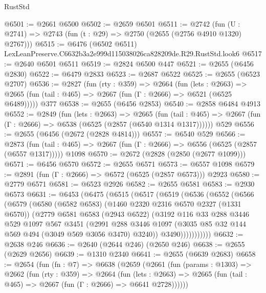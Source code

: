 \begin{lexlean}{RustStd}
\begin{coremodule}
@6501 := @2661 @6500
@6502 := @2659 @6501
@6511 := @2742 (fun (U : @2741) => @2743 (fun (t : @29) => @2750 (@2655 (@2756 @4910 @1320) @2767)))
@6515 := @6476 (@6502 @6511) LexLeanPreserve.C6632b3a2e999d115038026ca828209de.R29.RustStd.look6
@6517 := @2640 @6501 @6511
@6519 := @2824 @6500 @447
@6521 := @2655 (@6456 @2830)
@6522 := @6479 @2833
@6523 := @2687 @6522
@6525 := @2655 (@6523 @2707)
@6536 := @2827
    (fun (rty : @359) =>
    @2664
      (fun (lets : @2663) =>
      @2665 (fun (tail : @465) => @2667 (fun (Γ : @2666) => @6521 (@6525 @6489)))))
    @377
@6538 := @2655 (@6456 @2853)
@6540 := @2858 @6484 @4913
@6552 := @2849
    (fun (lets : @2663) =>
    @2665
      (fun (tail : @465) => @2667 (fun (Γ : @2666) => @6538 (@6525 (@2857 (@6540 @1314 @1317))))))
    @529
@6556 := @2655 (@6456 (@2672 (@2828 @4814)))
@6557 := @6540 @529
@6566 := @2873
    (fun (tail : @465) => @2667 (fun (Γ : @2666) => @6556 (@6525 (@2857 (@6557 @1317)))))
    @1098
@6570 := @2672 (@2828 (@2850 (@2677 @1099)))
@6571 := @6456 @6570
@6572 := @2655 @6571
@6573 := @6557 @1098
@6579 := @2891 (fun (Γ : @2666) => @6572 (@6525 (@2857 @6573))) @2923
@6580 := @2779 @6571
@6581 := @6523 @2926
@6582 := @2655 @6581
@6583 := @2930 @6573
@6631 := @6453
    (@6475
      (@6515
        (@6517
          (@6519
            (@6536
              (@6552
                (@6566
                  (@6579
                    (@6580
                      (@6582 @6583)
                      (@1460 @2320 @2316 @6570 @2327 (@1331 @6570))
                      (@2779
                        @6581
                        @6583
                        (@2943 @6522)
                        (@3192
                          @116
                          @33
                          @288
                          @3446
                          @529
                          @1097
                          @567
                          @3451
                          (@2991
                            @288
                            @3446
                            @1097
                            (@3035 @85 @32 @144 @569 @494 (@3049 @569 @3056 @3470) @3240))
                          @3490)))))))))))
@6632 := @2638 @246
@6636 := @2640 (@2644 @246) (@2650 @246)
@6638 := @2655 (@2629 @2656)
@6639 := @1310 @2340
@6641 := @2655 (@6639 @2683)
@6658 := @2654
    (fun (fn : @7) =>
    @6638
      (@2659
        (@2661
          (fun (params : @1303) =>
          @2662
            (fun (rty : @359) =>
            @2664
              (fun (lets : @2663) =>
              @2665 (fun (tail : @465) => @2667 (fun (Γ : @2666) => @6641 @2728))))))

\end{coremodule}
\end{lexlean}
